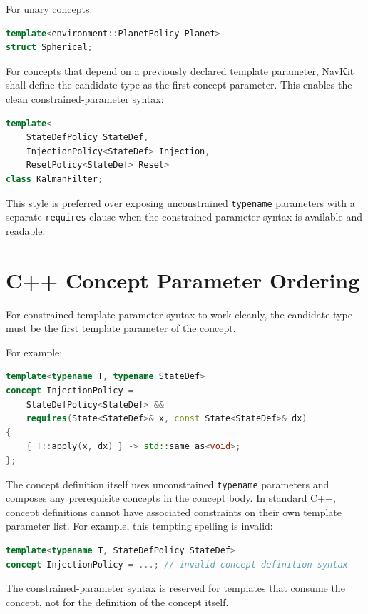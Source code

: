 \documentclass[11pt]{article}
\begin{document}
For unary concepts:

\begin{lstlisting}[language=C++]
template<environment::PlanetPolicy Planet>
struct Spherical;
\end{lstlisting}

For concepts that depend on a previously declared template parameter, NavKit
shall define the candidate type as the first concept parameter. This enables
the clean constrained-parameter syntax:

\begin{lstlisting}[language=C++]
template<
    StateDefPolicy StateDef,
    InjectionPolicy<StateDef> Injection,
    ResetPolicy<StateDef> Reset>
class KalmanFilter;
\end{lstlisting}

This style is preferred over exposing unconstrained \texttt{typename}
parameters with a separate \texttt{requires} clause when the constrained
parameter syntax is available and readable.

\section{C++ Concept Parameter Ordering}

For constrained template parameter syntax to work cleanly, the candidate type
must be the first template parameter of the concept.

For example:

\begin{lstlisting}[language=C++]
template<typename T, typename StateDef>
concept InjectionPolicy =
    StateDefPolicy<StateDef> &&
    requires(State<StateDef>& x, const State<StateDef>& dx)
{
    { T::apply(x, dx) } -> std::same_as<void>;
};
\end{lstlisting}

The concept definition itself uses unconstrained \texttt{typename} parameters
and composes any prerequisite concepts in the concept body. In standard C++,
concept definitions cannot have associated constraints on their own template
parameter list. For example, this tempting spelling is invalid:

\begin{lstlisting}[language=C++]
template<typename T, StateDefPolicy StateDef>
concept InjectionPolicy = ...; // invalid concept definition syntax
\end{lstlisting}

The constrained-parameter syntax is reserved for templates that consume the
concept, not for the definition of the concept itself.
\end{document}
